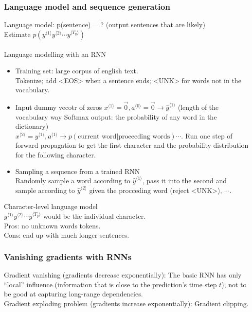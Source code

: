 \subsubsection{Language model and sequence generation}
Language model: p(sentence) = ? (output sentences that are likely)\\
Estimate $p(y^{\langle 1 \rangle}y^{\langle 2 \rangle} \cdots y^{\langle T_y \rangle})$\\
\\
Language modelling with an RNN
\begin{itemize}
\item
Training set: large corpus of english text.\\
Tokenize; add <EOS> when a sentence ends; <UNK> for words not in the vocabulary.
\item
Input dummy vecotr of zeros $x^{\langle 1 \rangle} = \overrightarrow{0}, a^{\langle 0 \rangle} = \overrightarrow{0} \rightarrow \hat{y}^{\langle 1 \rangle}$ (length of the vocabulary way Softmax output: the probability of any word in the dictionary)\\
$x^{\langle 2 \rangle} = y^{\langle 1 \rangle}, a^{\langle 1 \rangle} \rightarrow p(\text{current word}|\text{proceeding words}) \cdots$. Run one step of forward propagation to get the first character and the probability distribution for the following character.
\item
Sampling a sequence from a trained RNN\\
Randomly sample a word according to $ \hat{y}^{\langle 1 \rangle}$, pass it into the second and sample according to $ \hat{y}^{\langle 2 \rangle}$ given the procceding word (reject <UNK>), $\cdots$.
\end{itemize}
Character-level language model\\
$y^{\langle 1 \rangle}y^{\langle 2 \rangle} \cdots y^{\langle T_y \rangle}$ would be the individual character.\\
Pros: no unknown words tokens.\\
Cons: end up with much longer sentences.\\

\subsubsection{Vanishing gradients with RNNs}
Gradient vanishing (gradients decrease exponentially): The basic RNN has only ``local'' influence (information that is close to the prediction's time step $t$), not to be good at capturing long-range dependencies.\\
Gradient exploding problem (gradients increase exponentially): Gradient clipping.\\



